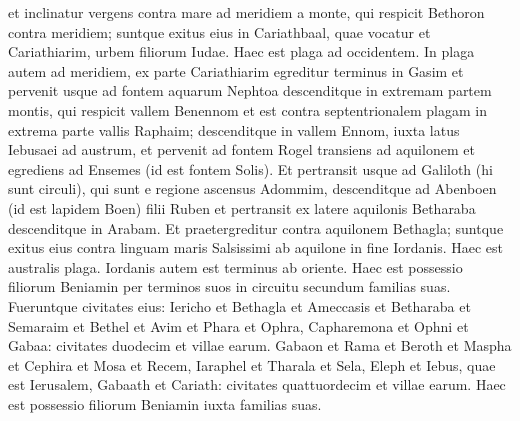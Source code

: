 \begin{biblechapter}
\begin{biblechapter}
\begin{biblechapter}
\begin{biblechapter}
\begin{biblechapter}
\begin{biblechapter}
\begin{biblechapter}
\begin{biblechapter}
\begin{biblechapter}
\begin{biblechapter}
\begin{biblechapter}
\begin{biblechapter}
\begin{biblechapter}
\begin{biblechapter}
\begin{biblechapter}
\begin{biblechapter}
\begin{biblechapter}
\begin{biblechapter}
\verse et inclinatur vergens contra mare ad meridiem a monte, qui respicit Bethoron contra meridiem; suntque exitus eius in Cariathbaal, quae vocatur et Cariathiarim, urbem filiorum Iudae. Haec est plaga ad occidentem. 
\verse In plaga autem ad meridiem, ex parte Cariathiarim egreditur terminus in Gasim et pervenit usque ad fontem aquarum Nephtoa 
\verse descenditque in extremam partem montis, qui respicit vallem Benennom et est contra septentrionalem plagam in extrema parte vallis Raphaim; descenditque in vallem Ennom, iuxta latus Iebusaei ad austrum, et pervenit ad fontem Rogel 
\verse transiens ad aquilonem et egrediens ad Ensemes (id est fontem Solis). Et pertransit usque ad Galiloth (hi sunt circuli), qui sunt e regione ascensus Adommim, descenditque ad Abenboen (id est lapidem Boen) filii Ruben 
\verse et pertransit ex latere aquilonis Betharaba descenditque in Arabam. 
\verse Et praetergreditur contra aquilonem Bethagla; suntque exitus eius contra linguam maris Salsissimi ab aquilone in fine Iordanis. Haec est australis plaga. 
\verse Iordanis autem est terminus ab oriente. Haec est possessio filiorum Beniamin per terminos suos in circuitu secundum familias suas.
 \verse Fueruntque civitates eius: Iericho et Bethagla et Ameccasis 
\verse et Betharaba et Semaraim et Bethel 
\verse et Avim et Phara et Ophra, 
\verse Capharemona et Ophni et Gabaa: civitates duodecim et villae earum. 
\verse Gabaon et Rama et Beroth 
\verse et Maspha et Cephira et Mosa 
\verse et Recem, Iaraphel et Tharala 
\verse et Sela, Eleph et Iebus, quae est Ierusalem, Gabaath et Cariath: civitates quattuordecim et villae earum. Haec est possessio filiorum Beniamin iuxta familias suas.
 

\end{biblechapter}
\end{biblechapter}
\end{biblechapter}
\end{biblechapter}
\end{biblechapter}
\end{biblechapter}
\end{biblechapter}
\end{biblechapter}
\end{biblechapter}
\end{biblechapter}
\end{biblechapter}
\end{biblechapter}
\end{biblechapter}
\end{biblechapter}
\end{biblechapter}
\end{biblechapter}
\end{biblechapter}
\end{biblechapter}
